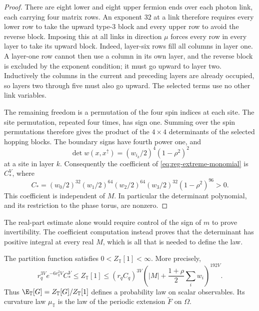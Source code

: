 \begin{proof}
There are eight lower and eight upper fermion ends over each photon
link, each carrying four matrix rows. An exponent $32$ at a link
therefore requires every lower row to take the upward type-$3$
block and every upper row to avoid the reverse block. Imposing this
at all links in direction $\mu$ forces every row in every layer to
take its upward block. Indeed, layer-six rows fill all columns in
layer one. A layer-one row cannot then use a column in its own layer,
and the reverse block is excluded by the exponent condition; it must
go upward to layer two. Inductively the columns in the current and
preceding layers are already occupied, so layers two through five
must also go upward. The selected terms use no other link variables.

The remaining freedom is a permutation of the four spin indices at
each site. The site permutation, repeated four times, has sign one.
Summing over the spin permutations therefore gives the product of
the $4\times4$ determinants of the selected hopping blocks. The
boundary signs have fourth power one, and
\[
 \det w(x,x^\uparrow)
   =(w_{i_k}/2)^4(1-\rho^2)^2
\]
at a site in layer $k$. Consequently the coefficient of
\eqref{eq:reg-extreme-monomial} is $C_*^V$, where
\begin{equation}\label{eq:reg-extreme-coefficient}
 C_*=(w_0/2)^{32}(w_1/2)^{64}(w_2/2)^{64}(w_3/2)^{32}
                                           (1-\rho^2)^{96}>0.
\end{equation}
This coefficient is independent of $M$. In particular the determinant
polynomial, and its restriction to the phase torus, are nonzero.
\end{proof}

The real-part estimate alone would require control of the sign of
$m$ to prove invertibility. The coefficient computation instead
proves that the determinant has positive integral at every real $M$,
which is all that is needed to define the law.

\begin{proposition}\label{prop:reg-partition}
The partition function satisfies $0<Z_{\mathbb T}[1]<\infty$.
More precisely,
\begin{equation}\label{eq:reg-partition-bounds}
 r_q^{3V}e^{-6r_q^2V}C_*^V
 \le Z_{\mathbb T}[1]
 \le(r_qC_q)^{3V}\left(|M|+\frac{1+\rho}{2}\sum_iw_i\right)^{192V}.
\end{equation}
Thus $\E_{\mathbb T}[G]=Z_{\mathbb T}[G]/Z_{\mathbb T}[1]$ defines a
probability law on scalar observables. Its curvature law
$\mu_{\mathbb T}$ is the law of the periodic extension $\widetilde F$
on $\Omega$.
\end{proposition}

